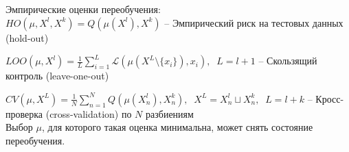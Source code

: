 \documentclass{article}
\begin{document}
    Эмпирические оценки переобучения:\\
    
    $HO(\mu,X^l,X^k)=Q(\mu(X^l),X^k)$ -- Эмпирический риск на тестовых данных (hold-out)
    
    $LOO(\mu,X^l) = \frac{1}{L}\sum_{i=1}^L \mathcal{L}(\mu(X^L\setminus \{x_i\}),x_i),\;\;L=l+1$ -- Скользящий контроль (leave-one-out)
    
    $CV(\mu,X^L)=\frac{1}{N}\sum_{n=1}^N Q(\mu(X_n^l),X_n^k),\;\;X^L = X_n^l \sqcup X_n^k,\;\; L = l+k$ -- Кросс-проверка (cross-validation) по $N$ разбиениям\\
    
    Выбор $\mu$, для которого такая оценка минимальна, может снять состояние переобучения.
    
\end{document}
